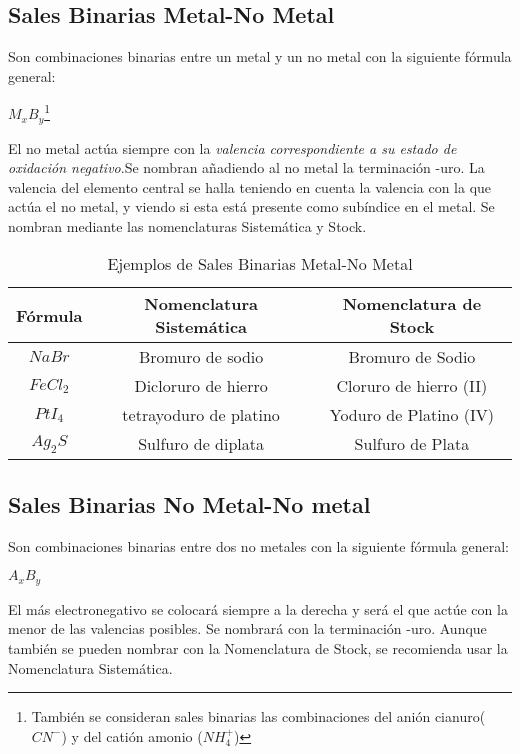\subsection{Sales Binarias Metal-No Metal}
Son combinaciones binarias entre un metal y un no metal con la siguiente fórmula general:\\
\begin{center}
$M_{x}B_y$\footnote{También se consideran sales binarias las combinaciones del anión cianuro($CN^{-}$) y del catión amonio ($NH^{+}_4$)}
\end{center}
El no metal actúa siempre con la \emph{valencia correspondiente a su estado de oxidación negativo}.Se nombran añadiendo al no metal la terminación -uro. La valencia del elemento central se halla teniendo en cuenta la valencia con la que actúa el no metal, y viendo si esta está presente como subíndice en el metal. Se nombran mediante las nomenclaturas Sistemática y Stock.
\begin{table}[h!]
	\centering
	\begin{tabular}{c|cc}
		Fórmula&Nomenclatura Sistemática&Nomenclatura de Stock\\ \hline
		$NaBr$&Bromuro de sodio&Bromuro de Sodio\\ 
		$FeCl_{2}$&Dicloruro de hierro&Cloruro de hierro (II)\\
		$PtI_{4}$&tetrayoduro de platino&Yoduro de Platino (IV)\\
		$Ag_{2}S$&Sulfuro de diplata&Sulfuro de Plata\\ \hline
	\end{tabular}
	\caption{Ejemplos de Sales Binarias Metal-No Metal}
\end{table}
\subsection{Sales Binarias No Metal-No metal}
Son combinaciones binarias entre dos no metales con la siguiente fórmula general:\\
\begin{center}
	$A_{x}B_y$
\end{center}
El más electronegativo se colocará siempre a la derecha y será el que actúe con la menor de las valencias posibles. Se nombrará con la terminación -uro. Aunque también se pueden nombrar con la Nomenclatura de Stock, se recomienda usar la Nomenclatura Sistemática. 

